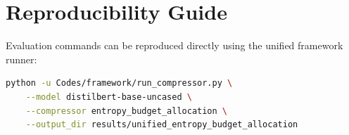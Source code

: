 \section{Reproducibility Guide}
Evaluation commands can be reproduced directly using the unified framework runner:
\begin{lstlisting}[language=bash]
python -u Codes/framework/run_compressor.py \
    --model distilbert-base-uncased \
    --compressor entropy_budget_allocation \
    --output_dir results/unified_entropy_budget_allocation
\end{lstlisting}
